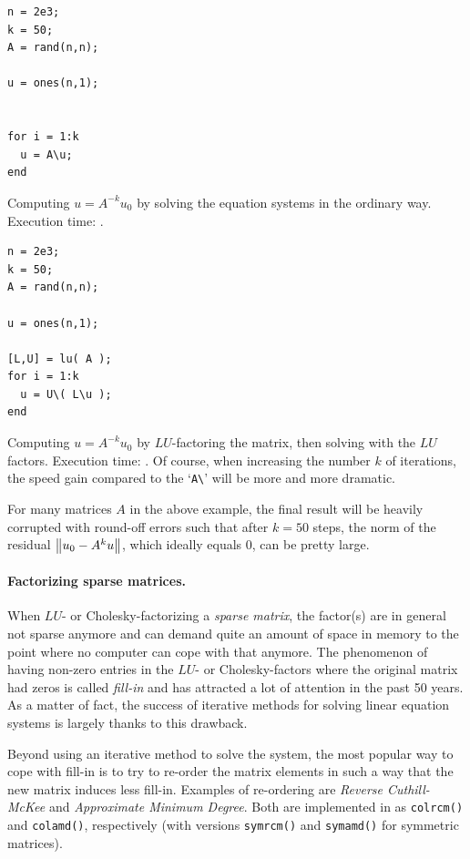 \hfill
\begin{minipage}[t]{.45\textwidth}
\begin{lstlisting}[framerule=2pt,rulecolor=\color{badred}]
n = 2e3;
k = 50;
A = rand(n,n);

u = ones(n,1);


for i = 1:k
  u = A\u;
end
\end{lstlisting}
Computing $u = A^{-k}u_0$ by solving the equation systems in the ordinary way.
Execution time: .
\end{minipage}
\hfill
\begin{minipage}[t]{.45\textwidth}
\begin{lstlisting}[framerule=2pt,rulecolor=\color{goodgreen}]
n = 2e3;
k = 50;
A = rand(n,n);

u = ones(n,1);

[L,U] = lu( A );
for i = 1:k
  u = U\( L\u );
end
\end{lstlisting}
Computing $u = A^{-k}u_0$ by $LU$-factoring the matrix, then solving with the $LU$ factors. Execution time: . Of course, when increasing  the number $k$ of iterations, the speed gain compared to the `\lstinline!A\!' will  be more and more dramatic.
\end{minipage}
\hfill

\begin{remark}
For many matrices $A$ in the above example, the final result will be heavily corrupted with round-off errors such that after $k=50$ steps, the norm of the residual $\left\|u_0-A^ku\right\|$, which ideally equals $0$, can be pretty large.
\end{remark}


\paragraph{Factorizing sparse matrices.}
When $LU$- or Cholesky-factorizing a \emph{sparse matrix}, the factor(s) are in
general not sparse anymore and can demand quite an amount of space in memory to
the point where no computer can cope with that anymore. The phenomenon of
having non-zero entries in the $LU$- or Cholesky-factors where the original
matrix had zeros is called \emph{fill-in} and has attracted a lot of attention
in the past 50 years. As a matter of fact, the success of iterative methods for
solving linear equation systems is largely thanks to this drawback.

Beyond using an iterative method to solve the system, the most popular way to
cope with fill-in is to try to re-order the matrix elements in such a way that
the new matrix induces less fill-in. Examples of re-ordering are \emph{Reverse
Cuthill-McKee} and \emph{Approximate Minimum Degree}. Both are implemented in
\matlab{} as \lstinline!colrcm()! and \lstinline!colamd()!, respectively (with
versions \lstinline!symrcm()! and \lstinline!symamd()! for symmetric matrices).

